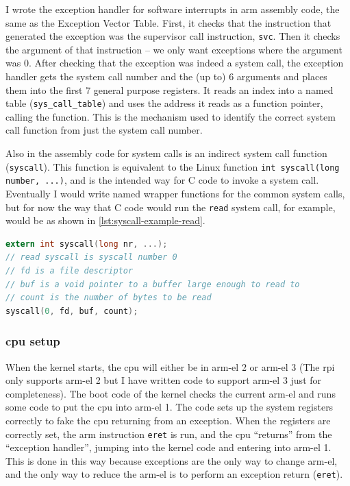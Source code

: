 \documentclass{article}
\begin{document}
I wrote the exception handler for software interrupts in \gls{arm} assembly
code, the same as the Exception Vector Table. First, it checks that the
instruction that generated the exception was the supervisor call instruction,
\verb!svc!. Then it checks the argument of that instruction -- we only want
exceptions where the argument was 0. After checking that the exception was
indeed a system call, the exception handler gets the system call number and the
(up to) 6 arguments and places them into the first 7 general purpose registers.
It reads an index into a named table (\verb!sys_call_table!) and uses the
address it reads as a function pointer, calling the function. This is the
mechanism used to identify the correct system call function from just the
system call number.

Also in the assembly code for system calls is an indirect system call function
(\verb!syscall!). This function is equivalent to the Linux function
\verb!int syscall(long number, ...)!, and is the intended way for C code to
invoke a system call. Eventually I would write named wrapper functions for the
common system calls, but for now the way that C code would run the
\texttt{read} system call, for example, would be as shown in
\autoref{lst:syscall-example-read}.

\begin{lstlisting}[language=C, caption={How some C code would invoke the system
                   call \texttt{read} in the current implementation.}, float,
                   label={lst:syscall-example-read}]
extern int syscall(long nr, ...);
// read syscall is syscall number 0
// fd is a file descriptor
// buf is a void pointer to a buffer large enough to read to
// count is the number of bytes to be read
syscall(0, fd, buf, count);
\end{lstlisting}

\subsubsection{\texorpdfstring{\gls{cpu}}{CPU} setup}
\label{sec:impl_cpu_setup}
When the kernel starts, the \gls{cpu} will either be in \gls{arm-el} 2 or
\gls{arm-el} 3 (The \gls{rpi} only supports \gls{arm-el} 2 but I have written
code to support \gls{arm-el} 3 just for completeness). The boot code of the
kernel checks the current \gls{arm-el} and runs some code to put the \gls{cpu}
into \gls{arm-el} 1. The code sets up the system registers correctly to fake
the \gls{cpu} returning from an exception. When the registers are correctly
set, the \gls{arm} instruction \texttt{eret} is run, and the \gls{cpu}
``returns'' from the ``exception handler'', jumping into the kernel code and
entering into \gls{arm-el} 1. This is done in this way because exceptions are
the only way to change \gls{arm-el}, and the only way to reduce the
\gls{arm-el} is to perform an exception return (\texttt{eret}).
\end{document}
